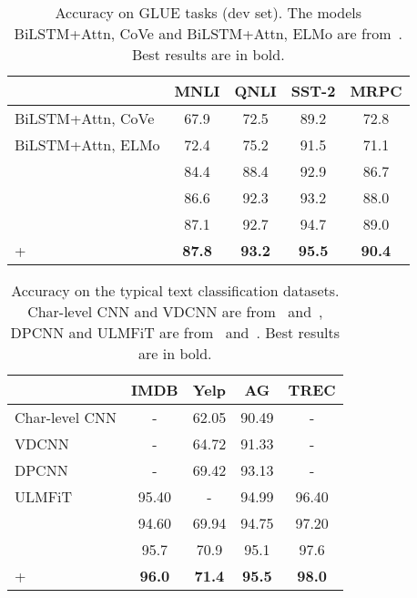 \documentclass[11pt]{article}
\begin{document}
\begin{table}[!tbp]
    \small
    \centering
	\resizebox{1.0\linewidth}{!}
	{
		\centering
		\begin{tabular}{l | c c c c}
			\hline
            & MNLI & QNLI & SST-2 & MRPC\\
			\hline
			BiLSTM+Attn, CoVe & 67.9 & 72.5 & 89.2 & 72.8\\
			BiLSTM+Attn, ELMo & 72.4 & 75.2 & 91.5 & 71.1\\
			 & 84.4 & 88.4 & 92.9 & 86.7  \\
			 & 86.6 & 92.3 & 93.2 & 88.0  \\ 
			\hline
			 & 87.1 & 92.7 & 94.7 & 89.0\\
			+ & \textbf{87.8} & \textbf{93.2} & \textbf{95.5} & \textbf{90.4}\\
			\hline
	\end{tabular} }
	\caption{Accuracy on GLUE tasks (dev set). The models BiLSTM+Attn, CoVe and BiLSTM+Attn, ELMo are from~. Best results are in bold.} 
	\label{cls_glue}
\end{table}

\begin{table}[!tbp]
    \small
    \centering
	\resizebox{1.0\linewidth}{!}
	{
		\centering
		\begin{tabular}{l | c c c c}
			\hline
            & IMDB & Yelp & AG & TREC\\
			\hline
			Char-level CNN & - & 62.05 & 90.49 & -\\
			VDCNN & - & 64.72 & 91.33 & - \\
			DPCNN & - & 69.42 & 93.13 & - \\
			ULMFiT & 95.40 & - & 94.99 & 96.40 \\
			 & 94.60 & 69.94 & 94.75 & 97.20  \\
			\hline
			 & 95.7 & 70.9 & 95.1 & 97.6\\
			+ & \textbf{96.0} & \textbf{71.4} & \textbf{95.5} & \textbf{98.0}\\
			\hline
	\end{tabular} }
	\caption{Accuracy on the typical text classification datasets. Char-level CNN and VDCNN are from~ and~, DPCNN and ULMFiT are from~ and~. Best results are in bold. } 
	\label{cls_zhang}
\end{table}
\end{document}
